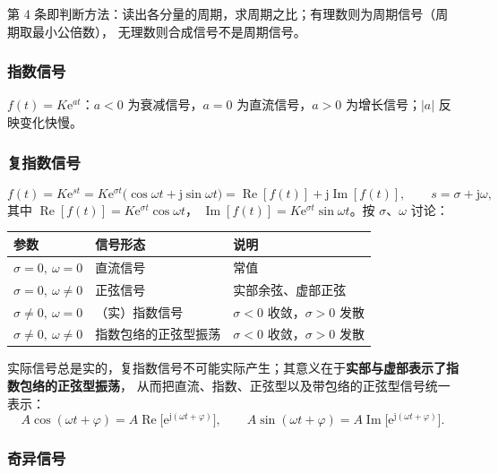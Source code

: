 第 4 条即判断方法：读出各分量的周期，求周期之比；有理数则为周期信号（周期取最小公倍数），
无理数则合成信号不是周期信号。

\subsubsection{指数信号}

$f(t)=K\mathrm{e}^{at}$：$a<0$ 为衰减信号，$a=0$ 为直流信号，$a>0$ 为增长信号；$|a|$ 反映变化快慢。

\subsubsection{复指数信号}

\begin{equation}
f(t)=K\mathrm{e}^{st}=K\mathrm{e}^{\sigma t}\big(\cos\omega t+\mathrm{j}\sin\omega t\big)
=\operatorname{Re}[f(t)]+\mathrm{j}\operatorname{Im}[f(t)],\qquad s=\sigma+\mathrm{j}\omega,
\end{equation}
其中 $\operatorname{Re}[f(t)]=K\mathrm{e}^{\sigma t}\cos\omega t$，
$\operatorname{Im}[f(t)]=K\mathrm{e}^{\sigma t}\sin\omega t$。按 $\sigma$、$\omega$ 讨论：

\begin{center}
\begin{tabular}{lll}
\toprule
参数 & 信号形态 & 说明 \\
\midrule
$\sigma=0,\ \omega=0$ & 直流信号 & 常值 \\
$\sigma=0,\ \omega\neq0$ & 正弦信号 & 实部余弦、虚部正弦 \\
$\sigma\neq0,\ \omega=0$ & （实）指数信号 & $\sigma<0$ 收敛，$\sigma>0$ 发散 \\
$\sigma\neq0,\ \omega\neq0$ & 指数包络的正弦型振荡 & $\sigma<0$ 收敛，$\sigma>0$ 发散 \\
\bottomrule
\end{tabular}
\end{center}

实际信号总是实的，复指数信号不可能实际产生；其意义在于\textbf{实部与虚部表示了指数包络的正弦型振荡}，
从而把直流、指数、正弦型以及带包络的正弦型信号统一表示：
\begin{equation}
A\cos(\omega t+\varphi)=A\operatorname{Re}\big[\mathrm{e}^{\mathrm{j}(\omega t+\varphi)}\big],\qquad
A\sin(\omega t+\varphi)=A\operatorname{Im}\big[\mathrm{e}^{\mathrm{j}(\omega t+\varphi)}\big].
\end{equation}

\subsubsection{奇异信号}

